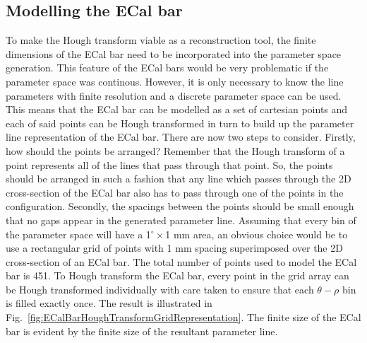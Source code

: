 \subsection{Modelling the ECal bar}
\label{subsec:ECalBarModel}
To make the Hough transform viable as a reconstruction tool, the finite dimensions of the ECal bar need to be incorporated into the parameter space generation.  This feature of the ECal bars would be very problematic if the parameter space was continous.  However, it is only necessary to know the line parameters with finite resolution and a discrete parameter space can be used.  This means that the ECal bar can be modelled as a set of cartesian points and each of said points can be Hough transformed in turn to build up the parameter line representation of the ECal bar.
\newline
There are now two steps to consider.  Firstly, how should the points be arranged?  Remember that the Hough transform of a point represents all of the lines that pass through that point.  So, the points should be arranged in such a fashion that any line which passes through the 2D cross-section of the ECal bar also has to pass through one of the points in the configuration.  Secondly, the spacings between the points should be small enough that no gaps appear in the generated parameter line.  
\newline
Assuming that every bin of the parameter space will have a 1$^\circ\times$1 mm area, an obvious choice would be to use a rectangular grid of points with 1 mm spacing superimposed over the 2D cross-section of an ECal bar.  The total number of points used to model the ECal bar is 451.  To Hough transform the ECal bar, every point in the grid array can be Hough transformed individually with care taken to ensure that each $\theta-\rho$ bin is filled exactly once.  The result is illustrated in Fig.~\ref{fig:ECalBarHoughTransformGridRepresentation}.  The finite size of the ECal bar is evident by the finite size of the resultant parameter line.
